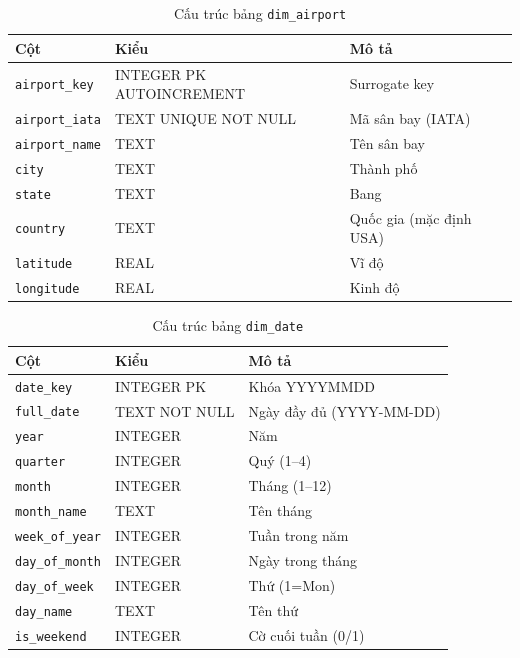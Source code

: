 \begin{table}[H]
\centering
\caption{Cấu trúc bảng \texttt{dim\_airport}}
\vspace{4pt}
\begin{tabular}{|l|l|l|}
\hline
\textbf{Cột} & \textbf{Kiểu} & \textbf{Mô tả} \\ \hline
\texttt{airport\_key}  & INTEGER PK AUTOINCREMENT & Surrogate key \\ \hline
\texttt{airport\_iata} & TEXT UNIQUE NOT NULL & Mã sân bay (IATA) \\ \hline
\texttt{airport\_name} & TEXT & Tên sân bay \\ \hline
\texttt{city}          & TEXT & Thành phố \\ \hline
\texttt{state}         & TEXT & Bang \\ \hline
\texttt{country}       & TEXT & Quốc gia (mặc định USA) \\ \hline
\texttt{latitude}      & REAL & Vĩ độ \\ \hline
\texttt{longitude}     & REAL & Kinh độ \\ \hline
\end{tabular}
\end{table}
  
\begin{table}[H]
\centering
\caption{Cấu trúc bảng \texttt{dim\_date}}
\vspace{4pt}
\begin{tabular}{|l|l|l|}
\hline
\textbf{Cột} & \textbf{Kiểu} & \textbf{Mô tả} \\ \hline
\texttt{date\_key}     & INTEGER PK & Khóa YYYYMMDD \\ \hline
\texttt{full\_date}    & TEXT NOT NULL & Ngày đầy đủ (YYYY-MM-DD) \\ \hline
\texttt{year}          & INTEGER & Năm \\ \hline
\texttt{quarter}       & INTEGER & Quý (1--4) \\ \hline
\texttt{month}         & INTEGER & Tháng (1--12) \\ \hline
\texttt{month\_name}   & TEXT & Tên tháng \\ \hline
\texttt{week\_of\_year}& INTEGER & Tuần trong năm \\ \hline
\texttt{day\_of\_month}& INTEGER & Ngày trong tháng \\ \hline
\texttt{day\_of\_week} & INTEGER & Thứ (1=Mon) \\ \hline
\texttt{day\_name}     & TEXT & Tên thứ \\ \hline
\texttt{is\_weekend}   & INTEGER & Cờ cuối tuần (0/1) \\ \hline
\end{tabular}
\end{table}

